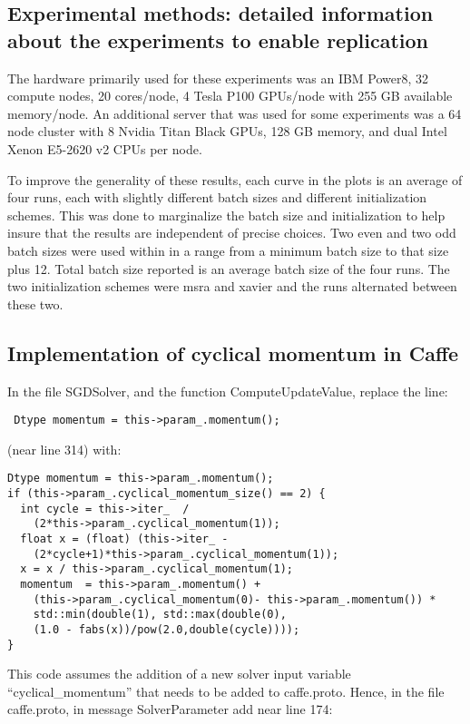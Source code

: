 \documentclass{article} %
\begin{document}
\subsection{Experimental methods: detailed information about the experiments to enable replication}
\label{sec:exp}

The hardware primarily used for these experiments was an IBM Power8, 32 compute nodes, 20 cores/node, 4 Tesla P100 GPUs/node with 255 GB available memory/node.  An additional server that was used for some experiments was a 64 node cluster with 8 Nvidia Titan Black GPUs, 128 GB memory, and dual Intel Xenon E5-2620 v2 CPUs per node.  

To improve the generality of these results, each curve in the plots is an average of four runs, each with slightly different batch sizes and different initialization schemes.  This was done to marginalize the batch size and initialization to help insure that the results are independent of precise choices.  Two even and two odd batch sizes were used within in a range from a minimum batch size to that size plus 12.  Total batch size reported is an average batch size of the four runs.  The two initialization schemes were msra and xavier and the runs alternated between these two.





\subsection{Implementation of cyclical momentum in Caffe}


In the file SGDSolver, and the function ComputeUpdateValue, replace the line:
 \begin{lstlisting}
 Dtype momentum = this->param_.momentum();
\end{lstlisting}
(near line 314) with:
\begin{lstlisting}
Dtype momentum = this->param_.momentum();
if (this->param_.cyclical_momentum_size() == 2) {
  int cycle = this->iter_  /
    (2*this->param_.cyclical_momentum(1));
  float x = (float) (this->iter_ - 
    (2*cycle+1)*this->param_.cyclical_momentum(1));
  x = x / this->param_.cyclical_momentum(1);
  momentum  = this->param_.momentum() + 
    (this->param_.cyclical_momentum(0)- this->param_.momentum()) *
    std::min(double(1), std::max(double(0), 
    (1.0 - fabs(x))/pow(2.0,double(cycle))));
}
\end{lstlisting}
This code assumes the addition of a new solver input variable ``cyclical\_momentum'' that needs to be added to caffe.proto.  Hence, in the file caffe.proto, in message SolverParameter add near line 174:
\end{document}
